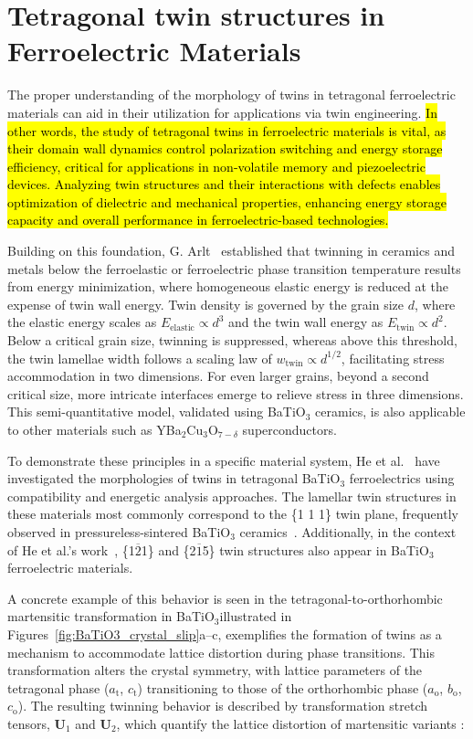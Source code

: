 \documentclass[a4paper,fleqn]{cas-sc}
\begin{document}
\section{Tetragonal twin structures in Ferroelectric Materials} \label{hierarchical_design}
The proper understanding of the morphology of twins in tetragonal ferroelectric materials can aid in their utilization for applications via twin engineering. \hl{In other words, the study of tetragonal twins in ferroelectric materials is vital, as their domain wall dynamics control polarization switching and energy storage efficiency, critical for applications in non-volatile memory and piezoelectric devices. Analyzing twin structures and their interactions with defects enables optimization of dielectric and mechanical properties, enhancing energy storage capacity and overall performance in ferroelectric-based technologies.} 
\par Building on this foundation, G. Arlt~\cite{Arlt1990-JMSC} established that twinning in ceramics and metals below the ferroelastic or ferroelectric phase transition temperature results from energy minimization, where homogeneous elastic energy is reduced at the expense of twin wall energy. Twin density is governed by the grain size \( d \), where the elastic energy scales as $E_{\text{elastic}}  \propto d^3 $ and the twin wall energy as $ E_{\text{twin}} \propto d^2. $ Below a critical grain size, twinning is suppressed, whereas above this threshold, the twin lamellae width follows a scaling law of $w_{\text{twin}} \propto d^{1/2}$, facilitating stress accommodation in two dimensions. For even larger grains, beyond a second critical size, more intricate interfaces emerge to relieve stress in three dimensions. This semi-quantitative model, validated using BaTiO\(_3\) ceramics, is also applicable to other materials such as YBa\(_2\)Cu\(_3\)O\(_{7-\delta}\) superconductors.
\par To demonstrate these principles in a specific material system, He et al.~\cite{HE2021116815} have investigated the morphologies of twins in tetragonal BaTiO$_3$ ferroelectrics using compatibility and energetic analysis approaches. The lamellar twin structures in these materials most commonly correspond to the \{1 1 1\} twin plane, frequently observed in pressureless-sintered BaTiO$_3$ ceramics~\cite{Wu2006-JACS}. Additionally, in the context of He et al.'s work~\cite{HE2021116815}, \{1$\overline{2}$1\} and \{2$\overline{1}$5\} twin structures also appear in BaTiO$_3$ ferroelectric materials.
\par A concrete example of this behavior is seen in the tetragonal-to-orthorhombic martensitic transformation in  BaTiO$_3$illustrated in Figures~\ref{fig:BaTiO3_crystal_slip}a--c, exemplifies the formation of twins as a mechanism to accommodate lattice distortion during phase transitions. This transformation alters the crystal symmetry, with lattice parameters of the tetragonal phase ($a_{\mathrm{t}}$, $c_{\mathrm{t}}$) transitioning to those of the orthorhombic phase ($a_{\mathrm{o}}$, $b_{\mathrm{o}}$, $c_{\mathrm{o}}$). The resulting twinning behavior is described by transformation stretch tensors, $\mathbf{U}_1$ and $\mathbf{U}_2$, which quantify the lattice distortion of martensitic variants :
\end{document}
